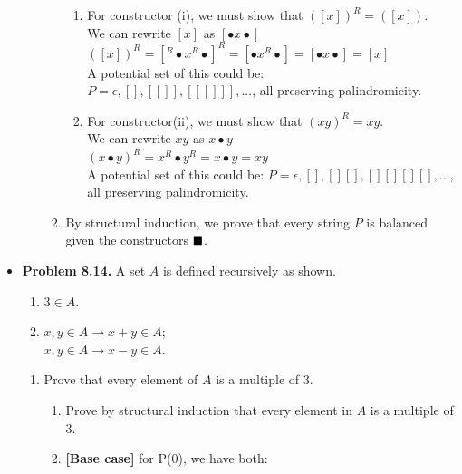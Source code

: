 \documentclass{article}
\begin{document}
\begin{itemize}
\begin{enumerate}[label=(d)]
\begin{enumerate}[label=\roman*.]
\begin{enumerate}[label=\arabic*.]
                    \item For constructor (i), we must show that $([x])^R = ([x])$.\\
                    We can rewrite $[x]$ as $[\bullet x \bullet]$\\
                    $([x])^R = [^R \bullet x^R \bullet ]^R = [\bullet x^R \bullet ] = [\bullet x \bullet] = [x]$\\
                    A potential set of this could be:\\
                    $P = {\epsilon, [], [[]], [[[]]], ...}$, all preserving palindromicity.
                    \item For constructor(ii), we must show that $(xy)^R = xy$.\\
                    We can rewrite $xy$ as $x \bullet y$\\
                    $(x \bullet y)^R = x^R \bullet y^R = x \bullet y = xy$\\
                    A potential set of this could be:
                    $P = {\epsilon, [], [][], [][][][], ...}$, all preserving palindromicity.
                \end{enumerate}
                \item By structural induction, we prove that every string $P$ is balanced given the constructors $\hfill\blacksquare$.
            \end{enumerate}
        \end{enumerate}
        \item \textbf{Problem 8.14.} A set $A$ is defined recursively as shown.
        \begin{enumerate}[label=\arabic*.]
            \item $3 \in A$.
            \item $x,y \in A \rightarrow x + y \in A$;\\
            $x,y \in A \rightarrow x-y \in A$.
        \end{enumerate}
        \begin{enumerate}[label=(\alph*)]
            \item Prove that every element of $A$ is a multiple of 3.
            \begin{enumerate}[label=\arabic*.]
                \item Prove by structural induction that every element in $A$ is a multiple of $3$.
                \item \textbf{[Base case]} for P(0), we have both:
                \begin{align*}

\end{align*}
\end{enumerate}
\end{enumerate}
\end{itemize}
\end{document}
